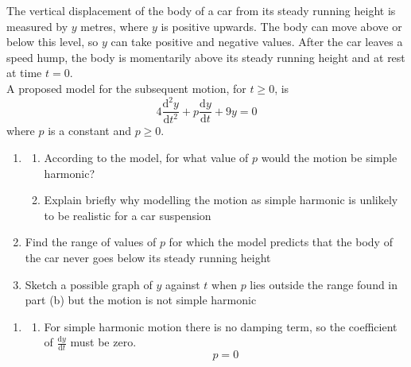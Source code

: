 \documentclass[leqno]{article}
\begin{document}
\djsFrontMatter
\begin{enumerate}[
  label=\textbf{\arabic*.},
  leftmargin=*,
  topsep=0pt,
  partopsep=0pt,
  parsep=0pt
]

\questionitem

The vertical displacement of the body of a car from its steady running height is measured by $y$ metres, where $y$ is positive upwards. The body can move above or below this level, so $y$ can take positive and negative values. After the car leaves a speed hump, the body is momentarily above its steady running height and at rest at time $t=0$. \\

A proposed model for the subsequent motion, for $t\ge 0$, is
\[
4\frac{\mathrm{d}^2 y}{\mathrm{d} t^2}+p\frac{\mathrm{d} y}{\mathrm{d} t}+9y=0
\]
where $p$ is a constant and $p\ge 0$. \\

\begin{enumerate}[label=\textbf{(\alph*)}]
  \item
  \begin{enumerate}[label=(\roman*)]
    \item According to the model, for what value of $p$ would the motion be simple harmonic? 
    \item Explain briefly why modelling the motion as simple harmonic is unlikely to be realistic for a car suspension  \\
  \end{enumerate}
  \item Find the range of values of $p$ for which the model predicts that the body of the car never goes below its steady running height  \\
  \item Sketch a possible graph of $y$ against $t$ when $p$ lies outside the range found in part (b) but the motion is not simple harmonic  \\
\end{enumerate}

\vspace*{10pt}

\begin{djsSolution}
\begin{enumerate}[label=\textbf{(\alph*)}]
  \item
  \begin{enumerate}[label=(\roman*)]
    \item For simple harmonic motion there is no damping term, so the coefficient of $\frac{\mathrm{d}y}{\mathrm{d}t}$ must be zero.
    \[
    p=0
    \]


\end{enumerate}
\end{enumerate}
\end{djsSolution}
\end{enumerate}
\end{document}
